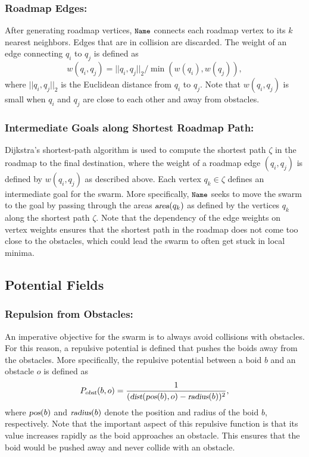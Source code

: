 \documentclass{llncs}
\newcommand{\Acronym}[1]{\ensuremath{{\small{\texttt{#1}}}}}
\newcommand{\Var}[1]{\ensuremath{{\small{\textsl{#1}}}}}
\newcommand{\Name}{\Acronym{Name}}
\begin{document}
\subsubsection{Roadmap Edges:}
After generating roadmap vertices, $\Name$ connects each
roadmap vertex to its $k$ nearest neighbors. Edges that are in
collision are discarded. The weight of an edge connecting $q_i$ to
$q_j$ is defined as
$$
w(q_i, q_j) = ||q_i, q_j||_2 / \min(w(q_i), w(q_j)),
$$
where $||q_i, q_j||_2$ is the Euclidean distance from $q_i$ to $q_j$. Note
that $w(q_i, q_j)$ is small when $q_i$ and $q_j$ are close to each
other and away from obstacles.


\subsubsection{Intermediate Goals along Shortest Roadmap Path:} Dijkstra's shortest-path
algorithm is used to compute the shortest path $\zeta$ in the roadmap
to the final destination, where the weight of a roadmap edge $(q_i, q_j)$ is
defined by $w(q_i, q_j)$ as described above. Each vertex $q_k \in
\zeta$ defines an intermediate goal for the swarm. More specifically,
$\Name$ seeks to move the swarm to the goal by passing through the
areas $\Var{area}(q_k)$ as defined by the vertices $q_k$ along the
shortest path $\zeta$. Note that the dependency of the edge weights
on vertex weights ensures that the shortest path in the roadmap does
not come too close to the obstacles, which could lead the swarm to
often get stuck in local minima.

\subsection{Potential Fields}
\label{sec:PF}

\subsubsection{Repulsion from Obstacles:}
\label{sec:PFobst} An imperative objective for
the swarm is to always avoid collisions with obstacles. For this
reason, a repulsive potential is defined that pushes the boids away
from the obstacles. More specifically, the repulsive potential between
a boid $b$ and an obstacle $o$ is defined as
$$ P_\Var{obst}(b, o) = \frac{1}{(\Var{dist}(\Var{pos}(b), o) - \Var{radius}(b))^2},
$$ where $\Var{pos}(b)$ and
$\Var{radius}(b)$ denote the position and radius of the boid $b$, respectively. Note that the
important aspect of this repulsive function is that its value
increases rapidly as the boid approaches an obstacle. This ensures
that the boid would be pushed away and never collide with an obstacle.
\end{document}
